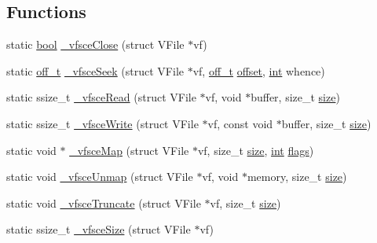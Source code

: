 \subsection*{Functions}
\begin{DoxyCompactItemize}
\item 
static \mbox{\hyperlink{libretro_8h_a4a26dcae73fb7e1528214a068aca317e}{bool}} \mbox{\hyperlink{sce-vfs_8c_abc890663d9c8ca3543876558a75cb392}{\+\_\+vfsce\+Close}} (struct V\+File $\ast$vf)
\item 
static \mbox{\hyperlink{__builder_8h_a53066be3c3a28d8b8ccb3dc95c1e49b1}{off\+\_\+t}} \mbox{\hyperlink{sce-vfs_8c_a88279b263254e86a68f5ed9774606e64}{\+\_\+vfsce\+Seek}} (struct V\+File $\ast$vf, \mbox{\hyperlink{__builder_8h_a53066be3c3a28d8b8ccb3dc95c1e49b1}{off\+\_\+t}} \mbox{\hyperlink{ioapi_8h_a601c4660e8a1a14a1b87fe387e934d19}{offset}}, \mbox{\hyperlink{ioapi_8h_a787fa3cf048117ba7123753c1e74fcd6}{int}} whence)
\item 
static ssize\+\_\+t \mbox{\hyperlink{sce-vfs_8c_a69b43cfbd3986b033257e6363f8d531f}{\+\_\+vfsce\+Read}} (struct V\+File $\ast$vf, void $\ast$buffer, size\+\_\+t \mbox{\hyperlink{ioapi_8h_a014d89bd76f74ef3a29c8f04b473eb76}{size}})
\item 
static ssize\+\_\+t \mbox{\hyperlink{sce-vfs_8c_a5f802766061345000a7795bb2cc0c0d9}{\+\_\+vfsce\+Write}} (struct V\+File $\ast$vf, const void $\ast$buffer, size\+\_\+t \mbox{\hyperlink{ioapi_8h_a014d89bd76f74ef3a29c8f04b473eb76}{size}})
\item 
static void $\ast$ \mbox{\hyperlink{sce-vfs_8c_a7a2054da859a0182af242a8a0eb6d50d}{\+\_\+vfsce\+Map}} (struct V\+File $\ast$vf, size\+\_\+t \mbox{\hyperlink{ioapi_8h_a014d89bd76f74ef3a29c8f04b473eb76}{size}}, \mbox{\hyperlink{ioapi_8h_a787fa3cf048117ba7123753c1e74fcd6}{int}} \mbox{\hyperlink{lr35902_2decoder_8c_a11f29eea941556f0630cfd3285f565c0}{flags}})
\item 
static void \mbox{\hyperlink{sce-vfs_8c_a294309dc9bd8e8bd80780494cb15e4a4}{\+\_\+vfsce\+Unmap}} (struct V\+File $\ast$vf, void $\ast$memory, size\+\_\+t \mbox{\hyperlink{ioapi_8h_a014d89bd76f74ef3a29c8f04b473eb76}{size}})
\item 
static void \mbox{\hyperlink{sce-vfs_8c_a2d93895f44e1589f7f3e3a2aa6850b08}{\+\_\+vfsce\+Truncate}} (struct V\+File $\ast$vf, size\+\_\+t \mbox{\hyperlink{ioapi_8h_a014d89bd76f74ef3a29c8f04b473eb76}{size}})
\item 
static ssize\+\_\+t \mbox{\hyperlink{sce-vfs_8c_ab0da49443a78b59044b44713a9164452}{\+\_\+vfsce\+Size}} (struct V\+File $\ast$vf)

\end{DoxyCompactItemize}
